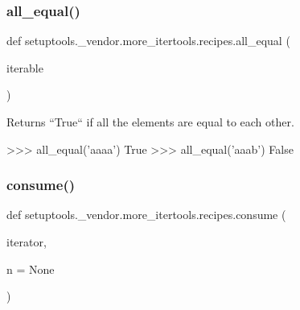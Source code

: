 \subsubsection{\texorpdfstring{all\+\_\+equal()}{all\_equal()}}
{\footnotesize\ttfamily def setuptools.\+\_\+vendor.\+more\+\_\+itertools.\+recipes.\+all\+\_\+equal (\begin{DoxyParamCaption}\item[{}]{iterable }\end{DoxyParamCaption})}

\begin{DoxyVerb}Returns ``True`` if all the elements are equal to each other.

    >>> all_equal('aaaa')
    True
    >>> all_equal('aaab')
    False\end{DoxyVerb}
 \mbox{\label{namespacesetuptools_1_1__vendor_1_1more__itertools_1_1recipes_aa68c8235e080c9a560f35985f8e102cd}} 
\subsubsection{\texorpdfstring{consume()}{consume()}}
{\footnotesize\ttfamily def setuptools.\+\_\+vendor.\+more\+\_\+itertools.\+recipes.\+consume (\begin{DoxyParamCaption}\item[{}]{iterator,  }\item[{}]{n = {\ttfamily None} }\end{DoxyParamCaption})}


